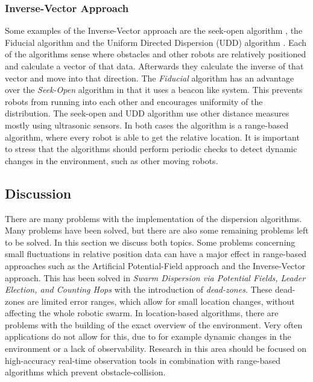 \subsubsection{Inverse-Vector Approach}
Some examples of the Inverse-Vector approach are the seek-open algorithm \cite{morlok2007dispersing}, the Fiducial algorithm \cite{morlok2007dispersing} and the Uniform Directed Dispersion (UDD) algorithm \cite{mclurkin2007distributed}.
Each of the algorithms sense where obstacles and other robots are relatively positioned and calculate a vector of that data.
Afterwards they calculate the inverse of that vector and move into that direction.
The \emph{Fiducial} algorithm has an advantage over the \emph{Seek-Open} algorithm in that it uses a beacon like system.
This prevents robots from running into each other and encourages uniformity of the distribution.
The seek-open and UDD algorithm use other distance measures mostly using ultrasonic sensors.
In both cases the algorithm is a range-based algorithm, where every robot is able to get the relative location.
It is important to stress that the algorithms should perform periodic checks to detect dynamic changes in the environment, such as other moving robots.
\subsection{Discussion}
There are many problems with the implementation of the dispersion algorithms.
Many problems have been solved, but there are also some remaining problems left to be solved.
In this section we discuss both topics.
Some problems concerning small fluctuations in relative position data can have a major effect in range-based approaches such as the Artificial Potential-Field approach and the Inverse-Vector approach.
This has been solved in \emph{Swarm Dispersion via Potential Fields, Leader Election, and Counting Hops} with the introduction of \emph{dead-zones}.
These dead-zones are limited error ranges, which allow for small location changes, without affecting the whole robotic swarm.
In location-based algorithms, there are problems with the building of the exact overview of the environment.
Very often applications do not allow for this, due to for example dynamic changes in the environment or a lack of observability.
Research in this area should be focused on high-accuracy real-time observation tools in combination with range-based algorithms which prevent obstacle-collision.

